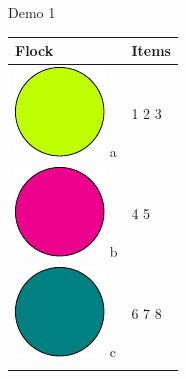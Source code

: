 \documentclass{beamer}
\begin{document}
\begin{frame}{Demo 1}
    \centering
    \begin{tabular}{ l l }
        \hline
        Flock & Items \\
        \hline
        \includegraphics[scale=0.15]{Figures/lime} a	& 1 2 3	\\
        \includegraphics[scale=0.15]{Figures/magenta} b	& 4 5	\\
        \includegraphics[scale=0.15]{Figures/teal} c	& 6 7 8	\\
        \arrayrulecolor{black}\hline
    \end{tabular}
    \vspace{0.5cm}
    

\end{frame}
\end{document}
